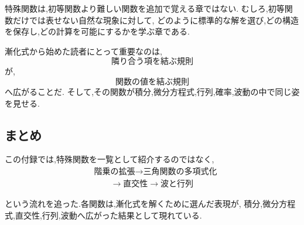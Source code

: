 特殊関数は,初等関数より難しい関数を追加で覚える章ではない.
むしろ,初等関数だけでは表せない自然な現象に対して,
どのように標準的な解を選び,どの構造を保存し,どの計算を可能にするかを学ぶ章である.

漸化式から始めた読者にとって重要なのは,
\[
  \text{隣り合う項を結ぶ規則}
\]
が,
\[
  \text{関数の値を結ぶ規則}
\]
へ広がることだ.
そして,その関数が積分,微分方程式,行列,確率,波動の中で同じ姿を見せる.

\subsection*{まとめ}

この付録では,特殊関数を一覧として紹介するのではなく,
\begin{align*}
  &\text{階乗の拡張}
  \longrightarrow
  \text{三角関数の多項式化}\\
  &\qquad
  \longrightarrow
  \text{直交性}
  \longrightarrow
  \text{波と行列}
\end{align*}

という流れを追った.各関数は,漸化式を解くために選んだ表現が,
積分,微分方程式,直交性,行列,波動へ広がった結果として現れている.
